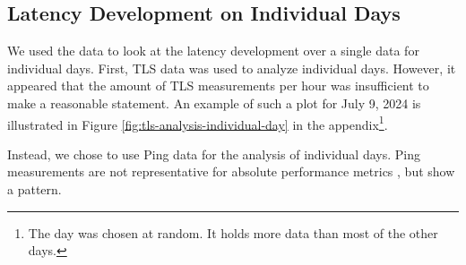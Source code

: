 \subsection{Latency Development on Individual Days} \label{sec:latency-individual-days}

We used the data to look at the latency development over a single data for
individual days. First, TLS data was used to analyze individual days. However,
it appeared that the amount of TLS measurements per hour was insufficient to
make a reasonable statement. An example of such a plot for July 9, 2024 is
illustrated in Figure \ref{fig:tls-analysis-individual-day} in the
appendix\footnote{The day was chosen at random. It holds more data than most of
	the other days.}.

Instead, we chose to use Ping data for the analysis of individual days. Ping
measurements are not representative for absolute performance metrics
\cite{DBLP:conf/imc/PelsserCVB13}, but show a pattern.

